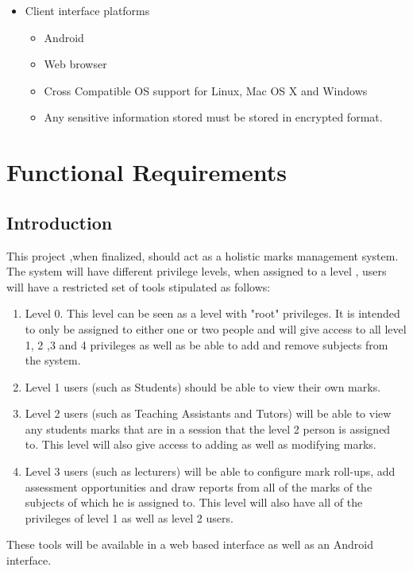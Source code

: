 \documentclass[10pt,a4paper]{article}
\begin{document}
                \begin{itemize}
                        \item Client interface platforms
                                                        \begin{itemize}
                                                                \item Android
                                                                \item Web browser
                                                                \item Cross Compatible OS support for Linux, Mac OS X and Windows
                                                                \item Any sensitive information stored must be stored in encrypted format.
                                                        \end{itemize}                                           
                \end{itemize}                                           
                
\section{Functional Requirements}
\subsection{Introduction}
This project ,when finalized, should act as a holistic marks management system. The system will have different privilege levels, when assigned to a level , users will have a restricted set of tools stipulated as follows: 
\begin{enumerate}
\item Level 0. This level can be seen as a level with "root" privileges. It is intended to only be assigned to either one or two people and will give access to all level 1, 2 ,3 and 4 privileges as well as be able to add and remove subjects from the system. 
\item Level 1 users (such as Students) should be able to view their own marks.
\item Level 2 users (such as Teaching Assistants and Tutors) will be able to view any students marks that are in a session that the level 2 person is assigned to. This level will also give access to adding as well as modifying marks.
\item Level 3 users (such as lecturers) will be able to configure mark roll-ups, add assessment opportunities and draw reports from all of the marks of the subjects of which he is assigned to. This level will also have all of the privileges of level 1 as well as level 2 users.
\end{enumerate}
These tools will be available in a web based interface as well as an Android interface.
\end{document}
